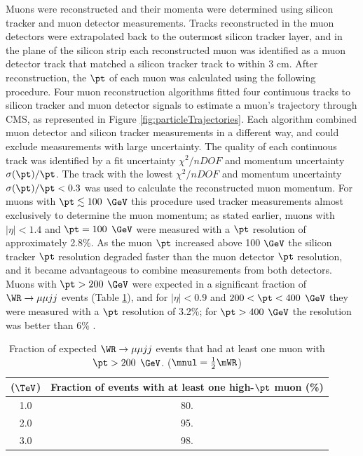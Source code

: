 Muons were reconstructed and their momenta were determined using silicon tracker and muon detector measurements.  
Tracks reconstructed in the muon detectors were extrapolated back to the outermost silicon tracker layer, and in the 
plane of the silicon strip each reconstructed muon was identified as a muon detector track that matched a silicon 
tracker track to within 3 cm.  After reconstruction, the $\pt$ of each muon was calculated using the following procedure.  
Four muon reconstruction algorithms fitted four continuous tracks \cite{cmsMuonRecoRunTwo} to silicon tracker and muon 
detector signals to estimate a muon's trajectory through CMS, as represented in Figure \ref{fig:particleTrajectories}.  Each 
algorithm combined muon detector and silicon tracker measurements in a different way, and could exclude measurements with 
large uncertainty.  The quality of each continuous track was identified by a fit uncertainty $\chi^{2}/nDOF$ and momentum 
uncertainty $\sigma(\pt)/\pt$.  The track with the lowest $\chi^{2}/nDOF$ and momentum uncertainty $\sigma(\pt)/\pt < 0.3$ was 
used to calculate the reconstructed muon momentum.  For muons with $\pt \lesssim 100$ $\GeV$ this procedure used tracker 
measurements almost exclusively to determine the muon momentum; as stated earlier, muons with $|\eta| < 1.4$ and $\pt = 100$ 
$\GeV$ were measured with a $\pt$ resolution of approximately 2.8\%.  As the muon $\pt$ increased above 100 $\GeV$ the 
silicon tracker $\pt$ resolution degraded faster than the muon detector $\pt$ resolution, and it became advantageous to 
combine measurements from both detectors.  Muons with $\pt > 200$ $\GeV$ were expected in a significant fraction of 
$\WR \rightarrow \mu\mu jj$ events (Table \ref{tab:wrHighPtMuons}), and for $|\eta| < 0.9$ and $200 < \pt < 400$ $\GeV$ 
they were measured with a $\pt$ resolution of 3.2\%; for $\pt > 400$ $\GeV$ the resolution was better than 6\% \cite{cmsMuonRecoRunTwo}.

\begin{table}[h]
	\caption{Fraction of expected $\WR \rightarrow \mu\mu jj$ events that had at least one muon with $\pt > 200$ $\GeV$. 
	($\mnul = \frac{1}{2}\mWR$)}
	\label{tab:wrHighPtMuons}
	\centering
	\begin{tabular}{c|c}
		\mWR ($\TeV$) & Fraction of events with at least one high-$\pt$ muon (\%) \\  \hline
		1.0 &  80.  \\
		2.0 &  95.  \\ 
		3.0 &  98.  \\ \hline
	\end{tabular}
\end{table}

